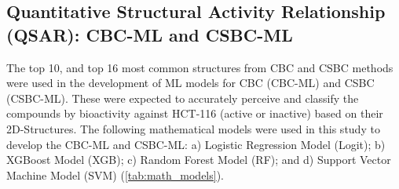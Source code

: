 \subsection*{Quantitative Structural Activity Relationship (QSAR): CBC-ML and CSBC-ML}
The top 10, and top 16 most common structures from CBC and CSBC methods were used in the development of ML models for CBC (CBC-ML) and CSBC (CSBC-ML). These were expected to accurately perceive and classify the compounds by bioactivity against HCT-116 (active or inactive) based on their 2D-Structures. The following mathematical models were used in this study to develop the CBC-ML and CSBC-ML: a) Logistic Regression Model (Logit); b) XGBoost Model (XGB); c) Random Forest Model (RF); and d) Support Vector Machine Model (SVM) (\autoref{tab:math_models}). 

\FloatBarrier %

